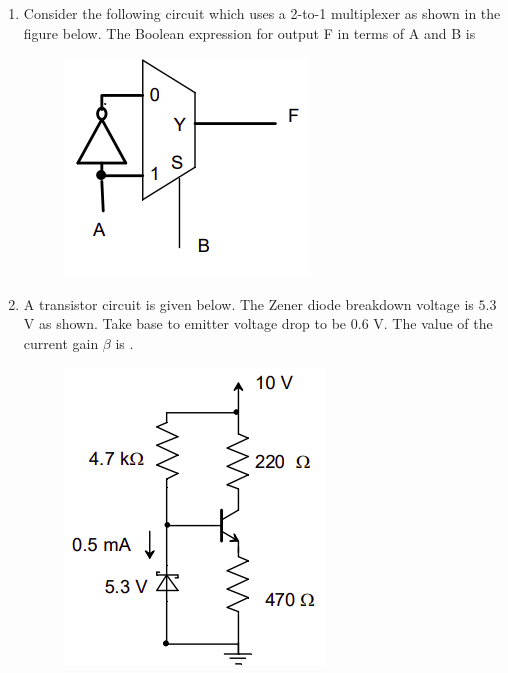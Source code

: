 \documentclass[journal,12pt,onecolumn]{IEEEtran}
\theoremstyle{remark}
\begin{document}
\begin{enumerate}[start=1, label=Q.\arabic*]
    \item Consider the following circuit which uses a 2-to-1 multiplexer as shown in the figure below. The Boolean expression for output F in terms of A and B is
    \begin{figure}[H]
        \includegraphics[width=0.5\columnwidth]{Figures/q11.png}
        \centering
        \caption{}
    \end{figure}
    \begin{enumerate}
    \end{enumerate}

    \hfill{}

    \item A transistor circuit is given below. The Zener diode breakdown voltage is $5.3$ V as shown. Take base to emitter voltage drop to be $0.6$ V. The value of the current gain $\beta$ is \underline{\hspace{2cm}}.
    \begin{figure}[H]
        \includegraphics[width=0.2\columnwidth]{Figures/q12.png}
        \centering
        \caption{}
        
    \end{figure}


\end{enumerate}
\end{document}
